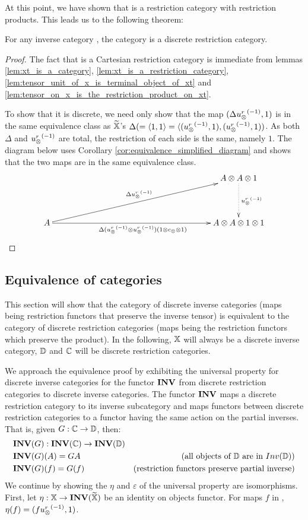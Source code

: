 
At this point, we have shown that \Xt is a restriction category with restriction products. This
leads us to the following theorem:

\begin{theorem}\label{thm:xt_is_a_discrete_crc_when_x_is_an_inverse_category}
  For any inverse category \X, the category \Xt is a discrete restriction category.
\end{theorem}
\begin{proof}
  The fact that \Xt is a Cartesian restriction category is immediate from lemmas
  \vref{lem:xt_is_a_category}, \vref{lem:xt_is_a_restriction_category},
  \vref{lem:tensor_unit_of_x_is_terminal_object_of_xt} and
  \vref{lem:tensor_on_x_is_the_restriction_product_on_xt}.

  To show that it is discrete, we need only show that the map $(\Delta {\ensuremath{u_{\otimes}^r}}^{(-1)},1)$ is in the
  same equivalence class as $\widetilde{\mathbb{X}}$'s $\Delta(= \langle1,1\rangle = \langle({u_{\otimes}^r}^{(-1)},1),({u_{\otimes}^r}^{(-1)},1))$. As both
  $\Delta$ and ${u_{\otimes}^r}^{(-1)}$ are total, the restriction of each side is the same, namely $1$. The
  diagram below uses Corollary \ref{cor:equivalence_simplified_diagram} and shows that the two maps
  are in the same equivalence class.
  \[
    \xymatrix @C=190pt @R=40pt{
      & A \* A \* 1 \ar@{.>}[d]^{\inv{\usr}}\\
      A \ar[ur]^{\Delta\inv{\usr}}
        \ar[r]_{\Delta(\inv{\usr}\*\inv{\usr})(1\*c_{\*}\*1)}& A\*A\*1\*1
    }
  \]
\end{proof}
\subsection{Equivalence of categories} %
\label{sub:equivalence_of_categories}

This section will show that the category of discrete inverse categories (maps being restriction
functors that preserve the inverse tensor) is equivalent to the category of discrete restriction
categories (maps being the restriction functors which preserve the product). In the following, $\mathbb{X}$
will always be a discrete inverse category, $\mathbb{D}$ and $\mathbb{C}$ will be discrete restriction categories.

We approach the equivalence proof by exhibiting the universal property for discrete inverse
categories for the functor $\mathbf{INV}$ from discrete restriction categories to discrete inverse
categories. The functor $\mathbf{INV}$ maps a discrete restriction category to its inverse subcategory and
maps functors between discrete restriction categories to a functor having the same action on the
partial inverses. That is, given $G:\mathbb{C} \to \mathbb{D}$, then:
\begin{align*}
  &\mathbf{INV}({G}): \mathbf{INV}({\mathbb{C}}) \to \mathbf{INV}({\mathbb{D}})\\
  &\mathbf{INV}({G})(A) = G{A}&\text{(all objects of $\mathbb{D}$ are in $Inv(\mathbb{D})$)}\\
  &\mathbf{INV}({G})(f) = G(f)&\text{(restriction functors preserve partial inverse)}
\end{align*}
We continue by showing the $\eta$ and $\varepsilon$ of the universal property are isomorphisms.
First, let $\eta:\mathbb{X} \to \mathbf{INV}({\widetilde{\mathbb{X}}})$ be an identity on objects functor. For maps $f$ in \X, $\eta(f)
= (f{u_{\otimes}^r}^{(-1)},1)$.

